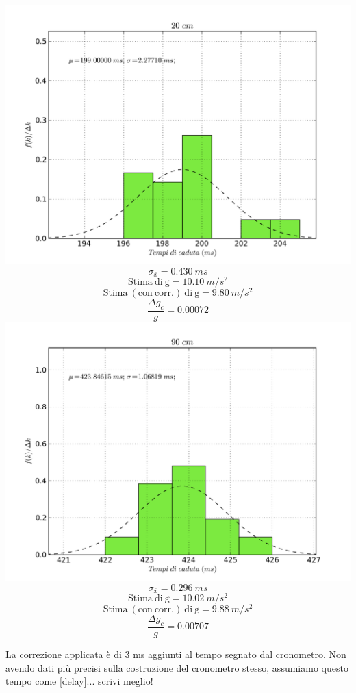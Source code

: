 \begin{center}
\includegraphics[scale=0.70]{../grafici/20cm.png}
$$\sigma_{\bar{x}} = 0.430\ ms$$
$$\mathrm{Stima\ di\ g} = 10.10\ m/s^2$$
$$\mathrm{Stima\ (con\ corr.)\ di\ g} = 9.80\ m/s^2 $$
$$\frac{\Delta g_c}{g} = 0.00072$$
\includegraphics[scale=0.70]{../grafici/90cm.png}
$$\sigma_{\bar{x}} = 0.296\ ms $$
$$\mathrm{Stima\ di\ g} = 10.02\ m/s^2$$
$$\mathrm{Stima\ (con\ corr.)\ di\ g} = 9.88\ m/s^2 $$
$$\frac{\Delta g_c}{g} = 0.00707$$
\end{center}

La correzione applicata è di 3 ms aggiunti al tempo segnato dal cronometro. Non avendo dati più precisi sulla costruzione del cronometro stesso, assumiamo questo tempo come [delay]... scrivi meglio!

